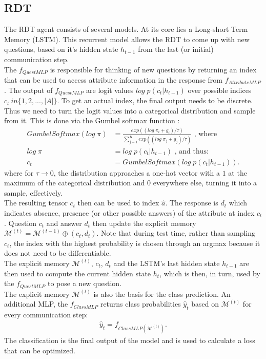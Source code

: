 \documentclass[a4paper,cleardoubleempty,BCOR1cm, 11pt]{report}
\begin{document}
\subsection{RDT}
The RDT agent consists of several models. At its core lies a Long-short Term Memory (LSTM). This recurrent model allows the RDT to come up with new questions, based on it's hidden state $h_{t-1}$ from the last (or initial) communication step.\\
The $f_{QuestMLP}$ is responsible for thinking of new questions by returning an index that can be used to access attribute information in the response from $f_{AttributeMLP}$. The output of $f_{QuestMLP}$ are logit values $log\;p(c_t|h_{t-1})$ over possible indices $c_t \ in \lbrace 1,2,...,|A| \rbrace$. To get an actual index, the final output needs to be discrete. Thus we need to turn the logit values into a categorical distribution and sample from it. This is done via the Gumbel softmax function \cite{jang2016categorical}:
\begin{align}
		GumbelSoftmax(log\;\pi) &= \frac{exp((log\;\pi_i + g_i)/\tau)}{\sum_{j=1}^{K}exp((log\;\pi_j + g_j)/\tau)}\text{ , where}\\
			log\;\pi &=log\;p(c_t|h_{t-1})\text{ , and thus:}\\
			c_t &= GumbelSoftmax(log\;p(c_t|h_{t-1})).
\end{align}
where for $\tau \rightarrow 0$, the distribution approaches a one-hot vector with a $1$ at the maximum of the categorical distribution and $0$ everywhere else, turning it into a sample, effectively.\\
The resulting tensor $c_t$ then can be used to index $\hat{a}$. The response is $d_t$ which indicates absence, presence (or other possible answers) of the attribute at index $c_t$. Question $c_t$ and answer $d_t$ then update the explicit memory $\mathcal{M}^{(t)} = \mathcal{M}^{(t-1)} \oplus (c_t, d_t)$. Note that during test time, rather than sampling $c_t$, the index with the highest probability is chosen through an argmax because it does not need to be differentiable.\\
The explicit memory $\mathcal{M}^{(t)}$, $c_t$, $d_t$ and the LSTM's last hidden state $h_{t-1}$ are then used to compute the current hidden state $h_t$, which is then, in turn, used by the $f_{QuestMLP}$ to pose a new question.\\
The explicit memory $\mathcal{M}^{(t)}$ is also the basis for the class prediction. An additional MLP, the $f_{ClassMLP}$ returns class probabilities $\hat{y}_t$ based on  $\mathcal{M}^{(t)}$ for every communication step:
\begin{align}
	\hat{y}_t = f_{ClassMLP( \mathcal{M}^{(t)})}.
\end{align} The classification is the final output of the model and is used to calculate a loss that can be optimized.
\end{document}
